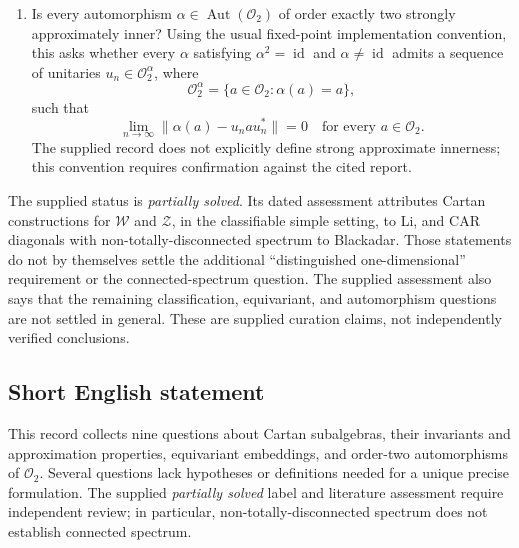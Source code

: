 \documentclass[11pt]{article}
\begin{document}
\begin{enumerate}
\[
\varphi\circ\beta_g=\gamma_g\circ\varphi\quad(g\in G).
\]
The requested conclusion would be that \(\varphi(D)\) is maximal abelian. This is only a template: the domain, group, actions, unitality requirements, and hypotheses intended by the source are missing.
\item Is every automorphism \(\alpha\in\operatorname{Aut}(\mathcal O_2)\) of order exactly two strongly approximately inner? Using the usual fixed-point implementation convention, this asks whether every \(\alpha\) satisfying \(\alpha^2=\operatorname{id}\) and \(\alpha\ne\operatorname{id}\) admits a sequence of unitaries \(u_n\in\mathcal O_2^\alpha\), where
\[
\mathcal O_2^\alpha=\{a\in\mathcal O_2:\alpha(a)=a\},
\]
such that
\[
\lim_{n\to\infty}\|\alpha(a)-u_nau_n^*\|=0
\quad\text{for every }a\in\mathcal O_2.
\]
The supplied record does not explicitly define strong approximate innerness; this convention requires confirmation against the cited report.
\end{enumerate}

The supplied status is \emph{partially solved}. Its dated assessment attributes Cartan constructions for \(\mathcal W\) and \(\mathcal Z\), in the classifiable simple setting, to Li, and CAR diagonals with non-totally-disconnected spectrum to Blackadar. Those statements do not by themselves settle the additional ``distinguished one-dimensional'' requirement or the connected-spectrum question. The supplied assessment also says that the remaining classification, equivariant, and automorphism questions are not settled in general. These are supplied curation claims, not independently verified conclusions.
\subsection{Short English statement}
This record collects nine questions about Cartan subalgebras, their invariants and approximation properties, equivariant embeddings, and order-two automorphisms of \(\mathcal O_2\). Several questions lack hypotheses or definitions needed for a unique precise formulation. The supplied \emph{partially solved} label and literature assessment require independent review; in particular, non-totally-disconnected spectrum does not establish connected spectrum.
\end{document}
